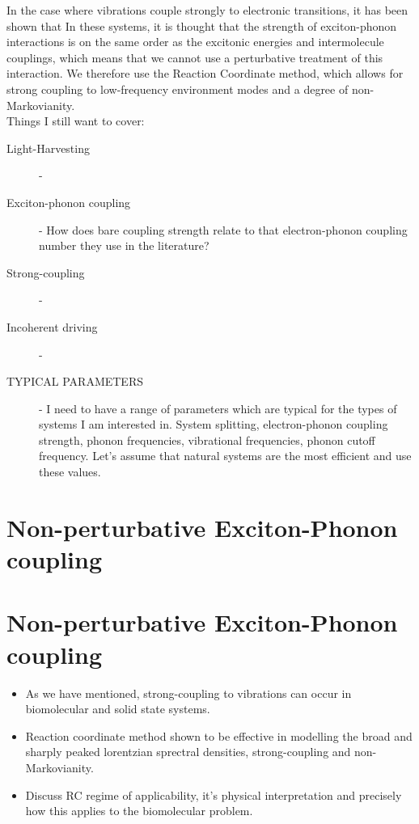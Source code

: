 \documentclass[]{article}
\begin{document}
In the case where vibrations couple strongly to electronic transitions, it has been shown that 
 In these systems, it is thought that the strength of exciton-phonon interactions is on the same order as the excitonic energies and intermolecule couplings, which means that we cannot use a perturbative treatment of this interaction. We therefore use the Reaction Coordinate method, which allows for strong coupling to low-frequency environment modes and a degree of non-Markovianity. 
\\ 


Things I still want to cover:
\begin{description}
	\item[Light-Harvesting] - 
	\item[Exciton-phonon coupling] - How does bare coupling strength relate to that electron-phonon coupling number they use in the literature?
	\item[Strong-coupling] - 
	\item[Incoherent driving] - 
	\item[TYPICAL PARAMETERS] - I need to have a range of parameters which are typical for the types of systems I am interested in. System splitting, electron-phonon coupling strength, phonon frequencies, vibrational frequencies, phonon cutoff frequency. Let's assume that natural systems are the most efficient and use these values.
\end{description}

\section{Non-perturbative Exciton-Phonon coupling}

\section{Non-perturbative Exciton-Phonon coupling}
\begin{itemize}
	\item As we have mentioned, strong-coupling to vibrations can occur in biomolecular and solid state systems.
	\item Reaction coordinate method shown to be effective in modelling the broad and sharply peaked lorentzian sprectral densities, strong-coupling and non-Markovianity.
	\item Discuss RC regime of applicability, it's physical interpretation and precisely how this applies to the biomolecular problem.
\end{itemize}
\end{document}
